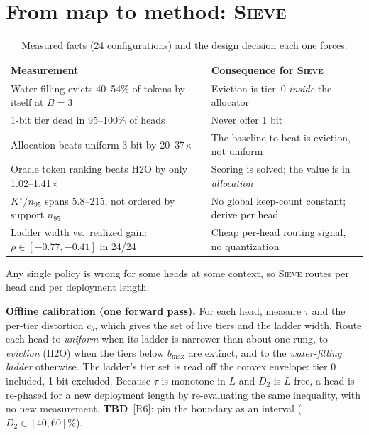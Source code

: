 \documentclass{article} %
\newcommand{\tbd}[1]{{\color{tbdcol}\textbf{TBD}~#1}}
\newcommand{\sieve}{\textsc{Sieve}}
\theoremstyle{definition}
\begin{document}
\section{From map to method: \sieve{}}
\label{sec:sieve}

\begin{table}[t]
\centering
\setlength{\tabcolsep}{4pt}
\caption{Measured facts (24 configurations) and the design decision each one forces.}
\label{tab:facts}
\footnotesize
\begin{tabular}{@{}ll@{}}
\toprule
\textbf{Measurement} & \textbf{Consequence for \sieve{}} \\
\midrule
Water-filling evicts 40--54\% of tokens by itself at $B{=}3$ & Eviction is tier~0 \emph{inside} the allocator \\
1-bit tier dead in 95--100\% of heads & Never offer 1 bit \\
Allocation beats uniform 3-bit by 20--37$\times$ & The baseline to beat is eviction, not uniform \\
Oracle token ranking beats H2O by only 1.02--1.41$\times$ & Scoring is solved; the value is in \emph{allocation} \\
$K^\star/n_{95}$ spans 5.8--215, not ordered by support $n_{95}$ & No global keep-count constant; derive per head \\
Ladder width vs.\ realized gain: $\rho\in[-0.77,-0.41]$ in 24/24 & Cheap per-head routing signal, no quantization \\
\bottomrule
\end{tabular}
\vspace{-2mm}
\end{table}

Any single policy is wrong for some heads at some context, so \sieve{} routes per head and per deployment length.

\textbf{Offline calibration (one forward pass).} For each head, measure $\tau$ and the per-tier distortion $c_b$, which gives the set of live tiers and the ladder width. Route each head to \emph{uniform} when its ladder is narrower than about one rung, to \emph{eviction} (H2O) when the tiers below $b_{\max}$ are extinct, and to the \emph{water-filling ladder} otherwise. The ladder's tier set is read off the convex envelope: tier 0 included, 1-bit excluded. Because $\tau$ is monotone in $L$ and $D_2$ is $L$-free, a head is re-phased for a new deployment length by re-evaluating the same inequality, with no new measurement. \tbd{[R6]: pin the boundary as an interval ($D_2\in[40,60]\%$).}
\end{document}
